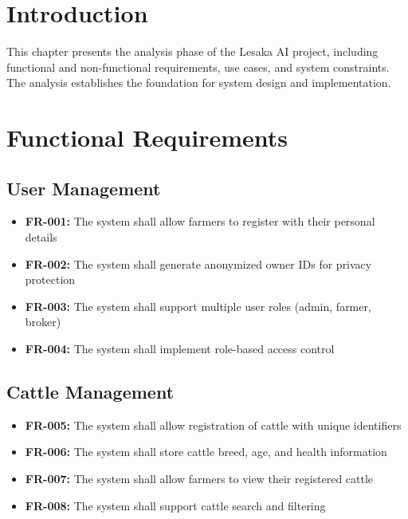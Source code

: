 
\section{Introduction}

This chapter presents the analysis phase of the Lesaka AI project, including functional and non-functional requirements, use cases, and system constraints. The analysis establishes the foundation for system design and implementation.

\section{Functional Requirements}

\subsection{User Management}

\begin{itemize}
    \item \textbf{FR-001:} The system shall allow farmers to register with their personal details
    \item \textbf{FR-002:} The system shall generate anonymized owner IDs for privacy protection
    \item \textbf{FR-003:} The system shall support multiple user roles (admin, farmer, broker)
    \item \textbf{FR-004:} The system shall implement role-based access control
\end{itemize}

\subsection{Cattle Management}

\begin{itemize}
    \item \textbf{FR-005:} The system shall allow registration of cattle with unique identifiers
    \item \textbf{FR-006:} The system shall store cattle breed, age, and health information
    \item \textbf{FR-007:} The system shall allow farmers to view their registered cattle
    \item \textbf{FR-008:} The system shall support cattle search and filtering
\end{itemize}

